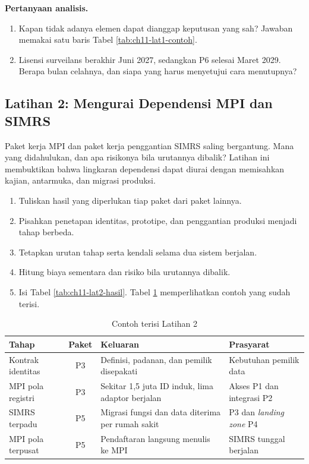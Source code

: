 \textbf{Pertanyaan analisis.}
\begin{enumerate}
  \item Kapan tidak adanya elemen dapat dianggap keputusan yang sah? Jawaban memakai satu baris Tabel \ref{tab:ch11-lat1-contoh}.
  \item Lisensi surveilans berakhir Juni 2027, sedangkan P6 selesai Maret 2029. Berapa bulan celahnya, dan siapa yang harus menyetujui cara menutupnya?
\end{enumerate}

\subsection*{Latihan 2: Mengurai Dependensi MPI dan SIMRS}

Paket kerja MPI dan paket kerja penggantian SIMRS saling bergantung. Mana yang didahulukan, dan apa risikonya bila urutannya dibalik? Latihan ini membuktikan bahwa lingkaran dependensi dapat diurai dengan memisahkan kajian, antarmuka, dan migrasi produksi.

\begin{enumerate}
  \item Tuliskan hasil yang diperlukan tiap paket dari paket lainnya.
  \item Pisahkan penetapan identitas, prototipe, dan penggantian produksi menjadi tahap berbeda.
  \item Tetapkan urutan tahap serta kendali selama dua sistem berjalan.
  \item Hitung biaya sementara dan risiko bila urutannya dibalik.
  \item Isi Tabel \ref{tab:ch11-lat2-hasil}. Tabel \ref{tab:ch11-lat2-contoh} memperlihatkan contoh yang sudah terisi.
\end{enumerate}

\begin{table}[!htb]
  \centering
  \caption{Contoh terisi Latihan 2}
  \label{tab:ch11-lat2-contoh}
  \small
  \begin{tabularx}{\textwidth}{>{\raggedright\arraybackslash}p{2.9cm}c>{\raggedright\arraybackslash}X>{\raggedright\arraybackslash}X}
    \hline
    \textbf{Tahap} & \textbf{Paket} & \textbf{Keluaran} & \textbf{Prasyarat} \\ \hline
    Kontrak identitas & P3 & Definisi, padanan, dan pemilik disepakati & Kebutuhan pemilik data \\ \hline
    MPI pola registri & P3 & Sekitar 1,5 juta ID induk, lima adaptor berjalan & Akses P1 dan integrasi P2 \\ \hline
    SIMRS terpadu & P5 & Migrasi fungsi dan data diterima per rumah sakit & P3 dan \textit{landing zone} P4 \\ \hline
    MPI pola terpusat & P5 & Pendaftaran langsung menulis ke MPI & SIMRS tunggal berjalan \\ \hline
  \end{tabularx}
\end{table}

